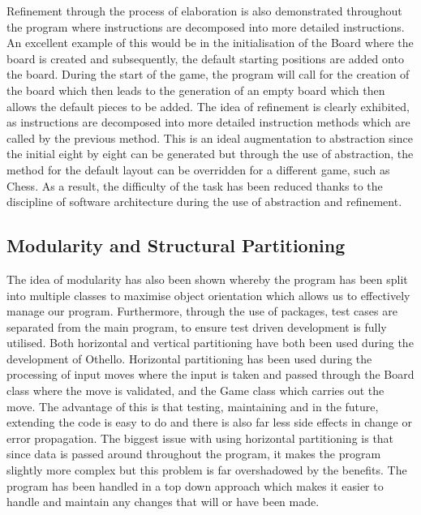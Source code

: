 \documentclass[a4wide, 11pt]{article}
\begin{document}
Refinement through the process of elaboration is also demonstrated throughout the program where instructions are decomposed into more detailed instructions. An excellent example of this would be in the initialisation of the Board where the board is created and subsequently, the default starting positions are added onto the board. During the start of the game, the program will call for the creation of the board which then leads to the generation of an empty board which then allows the default pieces to be added. The idea of refinement is clearly exhibited, as instructions are decomposed into more detailed instruction methods which are called by the previous method. This is an ideal augmentation to abstraction since the initial eight by eight can be generated but through the use of abstraction, the method for the default layout can be overridden for a different game, such as Chess. As a result, the difficulty of the task has been reduced thanks to the discipline of software architecture during the use of abstraction and refinement.

\subsection{Modularity and Structural Partitioning}
The idea of modularity has also been shown whereby the program has been split into multiple classes to maximise object orientation which allows us to effectively manage our program. Furthermore, through the use of packages, test cases are separated from the main program, to ensure test driven development is fully utilised. Both horizontal and vertical partitioning have both been used during the development of Othello. Horizontal partitioning has been used during the processing of input moves where the input is taken and passed through the Board class where the move is validated, and the Game class which carries out the move. The advantage of this is that testing, maintaining and in the future, extending the code is easy to do and there is also far less side effects in change or error propagation. The biggest issue with using horizontal partitioning is that since data is passed around throughout the program, it makes the program slightly more complex but this problem is far overshadowed by the benefits. The program has been handled in a top down approach which makes it easier to handle and maintain any changes that will or have been made.
\end{document}
